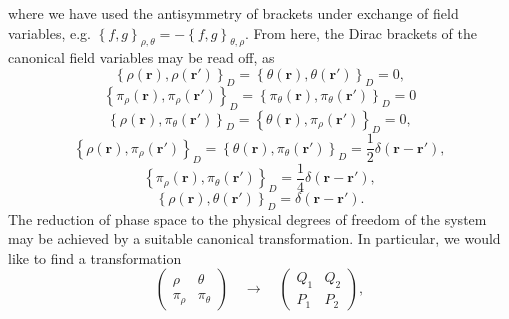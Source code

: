 \documentclass[twocolumn, nofootinbib, nobibnotes, amsmath,amssymb,aps, pra, floatfix]{revtex4-1}
\renewcommand{\v}[1]{\ensuremath{\mathbf{#1}}} %
\begin{document}
where we have used the antisymmetry of brackets under exchange of field variables, e.g. $\left\{ f,g \right\}_{\rho,\theta}=-\left\{ f,g \right\}_{\theta,\rho}$.
From here, the Dirac brackets of the canonical field variables may be read off, as
\begin{equation}
  \left\{ \rho\left( \v{r} \right),\rho\left( \v{r}' \right) \right\}_D=\left\{ \theta\left( \v{r} \right),\theta\left( \v{r}' \right) \right\}_D=0,
  \label{}
\end{equation}
\begin{equation}
  \left\{ \pi_{\rho}\left( \v{r} \right),\pi_{\rho}\left( \v{r}' \right) \right\}_D=\left\{ \pi_{\theta}\left( \v{r} \right),\pi_{\theta}\left( \v{r}' \right) \right\}_D=0
  \label{}
\end{equation}
\begin{equation}
  \left\{ \rho\left( \v{r} \right),\pi_{\theta}\left( \v{r}' \right) \right\}_D=\left\{ \theta\left( \v{r} \right),\pi_{\rho}\left( \v{r}' \right) \right\}_D=0,
  \label{}
\end{equation}
\begin{equation}
  \left\{ \rho\left( \v{r} \right),\pi_{\rho}\left( \v{r}' \right) \right\}_D=\left\{ \theta\left( \v{r} \right),\pi_{\theta}\left( \v{r}' \right) \right\}_D=\frac{1}{2}\delta\left( \v{r}-\v{r}' \right),
  \label{}
\end{equation}
\begin{equation}
  \left\{ \pi_{\rho}\left( \v{r} \right),\pi_{\theta}\left( \v{r}' \right) \right\}_D=\frac{1}{4}\delta\left( \v{r}-\v{r}' \right),
  \label{}
\end{equation}
\begin{equation}
  \left\{ \rho\left( \v{r} \right),\theta\left( \v{r}' \right) \right\}_D=\delta\left( \v{r}-\v{r}' \right).
  \label{}
\end{equation}
The reduction of phase space to the physical degrees of freedom of the system may be achieved by a suitable canonical transformation.
In particular, we would like to find a transformation
\begin{equation}
  \begin{pmatrix}
   \rho&\theta\\ 
   \pi_{\rho}&\pi_{\theta}
  \end{pmatrix}
  \quad\rightarrow\quad
  \begin{pmatrix}
    Q_1 & Q_2 \\
    P_1 & P_2
  \end{pmatrix},
  \label{}
\end{equation}
\end{document}
